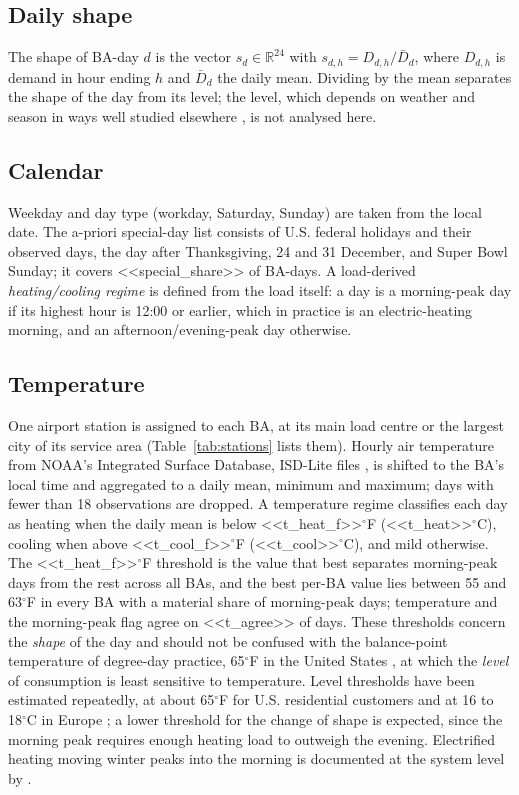\documentclass[conference]{IEEEtran}
\begin{document}
\subsection{Daily shape}
The shape of BA-day $d$ is the vector $s_d \in \mathbb{R}^{24}$ with $s_{d,h} = D_{d,h} / \bar{D}_d$, where $D_{d,h}$ is demand in hour ending $h$ and $\bar{D}_d$ the daily mean. Dividing by the mean separates the shape of the day from its level; the level, which depends on weather and season in ways well studied elsewhere \cite{hyndman2010density}, is not analysed here.

\subsection{Calendar}
Weekday and day type (workday, Saturday, Sunday) are taken from the local date. The a-priori special-day list consists of U.S. federal holidays and their observed days, the day after Thanksgiving, 24 and 31 December, and Super Bowl Sunday; it covers <<special_share>> of BA-days. A load-derived \emph{heating/cooling regime} is defined from the load itself: a day is a morning-peak day if its highest hour is 12:00 or earlier, which in practice is an electric-heating morning, and an afternoon/evening-peak day otherwise.

\subsection{Temperature}
One airport station is assigned to each BA, at its main load centre or the largest city of its service area (Table~\ref{tab:stations} lists them). Hourly air temperature from NOAA's Integrated Surface Database, ISD-Lite files \cite{isdlite}, is shifted to the BA's local time and aggregated to a daily mean, minimum and maximum; days with fewer than 18 observations are dropped. A temperature regime classifies each day as heating when the daily mean is below <<t_heat_f>>$^\circ$F (<<t_heat>>$^\circ$C), cooling when above <<t_cool_f>>$^\circ$F (<<t_cool>>$^\circ$C), and mild otherwise. The <<t_heat_f>>$^\circ$F threshold is the value that best separates morning-peak days from the rest across all BAs, and the best per-BA value lies between 55 and 63$^\circ$F in every BA with a material share of morning-peak days; temperature and the morning-peak flag agree on <<t_agree>> of days. These thresholds concern the \emph{shape} of the day and should not be confused with the balance-point temperature of degree-day practice, 65$^\circ$F in the United States \cite{thom1954degreedays}, at which the \emph{level} of consumption is least sensitive to temperature. Level thresholds have been estimated repeatedly, at about 65$^\circ$F for U.S. residential customers \cite{fels1986prism,engle1986weather} and at 16 to 18$^\circ$C in Europe \cite{valor2001spain,moralcarcedo2005nonlinear,bessec2008threshold}; a lower threshold for the change of shape is expected, since the morning peak requires enough heating load to outweigh the evening. Electrified heating moving winter peaks into the morning is documented at the system level by \cite{waite2020heating}.
\end{document}
